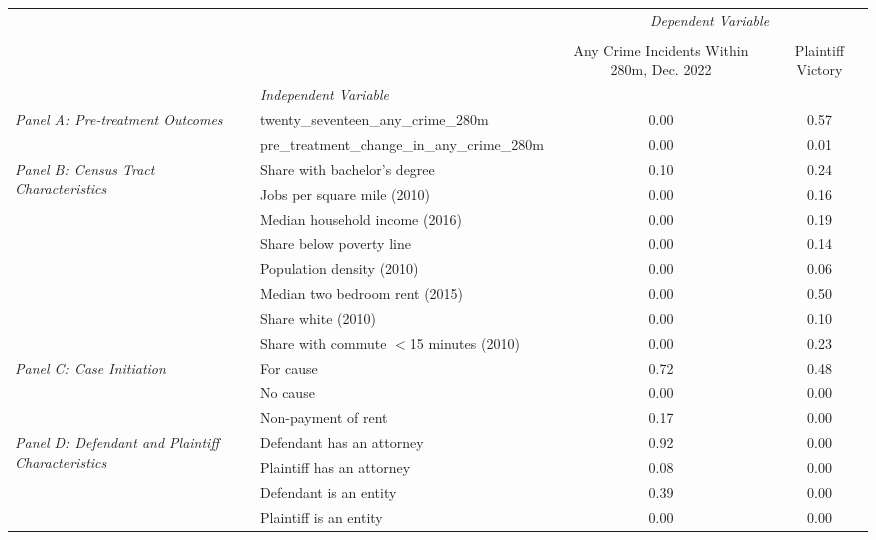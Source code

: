 \begin{tabular}{llcc}
\toprule
 &  & \multicolumn{2}{c}{\textit{Dependent Variable}} \\
\cline{3-4}
\\
 &  & Any Crime Incidents Within 280m, Dec. 2022 & Plaintiff Victory \\
 & \emph{Independent Variable} &  &  \\
\midrule
\multirow[c]{2}{3cm}{\textit{Panel A: Pre-treatment Outcomes}} & twenty_seventeen_any_crime_280m & 0.00 & 0.57 \\
 & pre_treatment_change_in_any_crime_280m & 0.00 & 0.01 \\
\cline{1-4}
\multirow[c]{8}{3cm}{\textit{Panel B: Census Tract Characteristics}} & Share with bachelor's degree & 0.10 & 0.24 \\
 & Jobs per square mile (2010) & 0.00 & 0.16 \\
 & Median household income (2016) & 0.00 & 0.19 \\
 & Share below poverty line & 0.00 & 0.14 \\
 & Population density (2010) & 0.00 & 0.06 \\
 & Median two bedroom rent (2015) & 0.00 & 0.50 \\
 & Share white (2010) & 0.00 & 0.10 \\
 & Share with commute $<$15 minutes (2010) & 0.00 & 0.23 \\
\cline{1-4}
\multirow[c]{3}{3cm}{\textit{Panel C: Case Initiation}} & For cause & 0.72 & 0.48 \\
 & No cause & 0.00 & 0.00 \\
 & Non-payment of rent & 0.17 & 0.00 \\
\cline{1-4}
\multirow[c]{4}{3cm}{\textit{Panel D: Defendant and Plaintiff Characteristics}} & Defendant has an attorney & 0.92 & 0.00 \\
 & Plaintiff has an attorney & 0.08 & 0.00 \\
 & Defendant is an entity & 0.39 & 0.00 \\
 & Plaintiff is an entity & 0.00 & 0.00 \\
\cline{1-4}
\bottomrule
\end{tabular}
